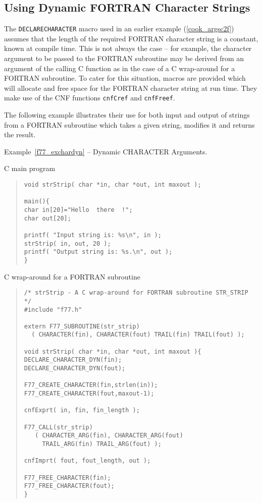 \documentclass[twoside,11pt]{article}
\newcommand{\htmlref}[2]{#1}
\newcommand{\latex}[1]{#1}
\newcommand{\xlabel}[1]{}
\renewcommand{\_}{\texttt{\symbol{95}}}
\newcounter{examples}
\begin{document}
\subsection{\xlabel{using_dynamic_fortran_character_strings}\label{f77_chardyn}Using Dynamic FORTRAN Character Strings}
The 
\htmlref{\texttt{DECLARE\_CHARACTER}}{DECLARE_CHARACTER}
macro used in 
\htmlref{an earlier example}{cook_argsc2f} \latex{(\ref{cook_argsc2f})}
assumes that the length of the required FORTRAN character string is a constant,
known at compile time. 
This is not always the case -- for example, the character argument to be 
passed to the FORTRAN subroutine may be derived from an argument of the 
calling C function as in the case of a C wrap-around for a FORTRAN subroutine.
To cater for this situation, macros are provided which will allocate and free
space for the FORTRAN character string at run time. 
They make use of the CNF functions
\htmlref{\texttt{cnfCref}}{cnfCref}
and
\htmlref{\texttt{cnfFreef}}{cnfFreef}.

The following example illustrates their use for both
input and output of strings from a FORTRAN subroutine which takes a given
string, modifies it and returns the result.

\label{f77_exchardyn}
\begin{center}
Example\latex{~\ref{f77_exchardyn}}
-- Dynamic CHARACTER Arguments.
\end{center}

C main program
{\small
\begin{quote} \begin{verbatim}
void strStrip( char *in, char *out, int maxout );

main(){
char in[20]="Hello  there  !";
char out[20];

printf( "Input string is: %s\n", in );
strStrip( in, out, 20 );
printf( "Output string is: %s.\n", out );
}
\end{verbatim} \end{quote}}
C wrap-around for a FORTRAN subroutine
{\small \begin{quote} \begin{verbatim}
/* strStrip - A C wrap-around for FORTRAN subroutine STR_STRIP */
#include "f77.h"

extern F77_SUBROUTINE(str_strip)
  ( CHARACTER(fin), CHARACTER(fout) TRAIL(fin) TRAIL(fout) );

void strStrip( char *in, char *out, int maxout ){
DECLARE_CHARACTER_DYN(fin);
DECLARE_CHARACTER_DYN(fout);

F77_CREATE_CHARACTER(fin,strlen(in));
F77_CREATE_CHARACTER(fout,maxout-1);

cnfExprt( in, fin, fin_length );

F77_CALL(str_strip)
   ( CHARACTER_ARG(fin), CHARACTER_ARG(fout)
     TRAIL_ARG(fin) TRAIL_ARG(fout) );

cnfImprt( fout, fout_length, out );

F77_FREE_CHARACTER(fin);
F77_FREE_CHARACTER(fout);
}
\end{verbatim} \end{quote} }
\end{document}
